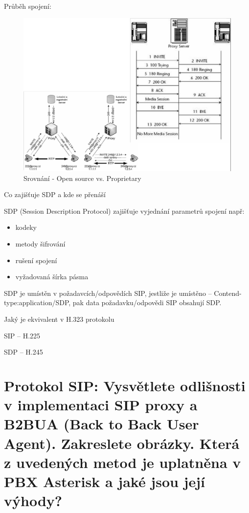 Průběh spojení:
\begin{figure}[h!]
    \begin{center}
        \includegraphics[width=\textwidth]{images/otazka26.png}
        \caption{Srovnání - Open source vs. Proprietary}
        \label{img:11}
    \end{center}
\end{figure}

Co zajišťuje SDP a kde se přenáší

SDP (Session Description Protocol) zajišťuje vyjednání parametrů spojení např:
\begin{itemize}[noitemsep]
    \item kodeky
    \item metody šifrování
    \item rušení spojení
    \item vyžadovaná šírka pásma
\end{itemize}

SDP je umístěn v požadavcích/odpovědích SIP, jestliže je umístěno -- Contend-type:application/SDP, pak data požadavku/odpovědi SIP obsahují SDP.

Jaký je ekvivalent v H.323 protokolu

SIP -- H.225

SDP -- H.245

\section{Protokol SIP: Vysvětlete odlišnosti v implementaci SIP proxy a B2BUA (Back to Back User Agent). Zakreslete obrázky. Která z uvedených metod je uplatněna v PBX Asterisk a jaké jsou její výhody?}

